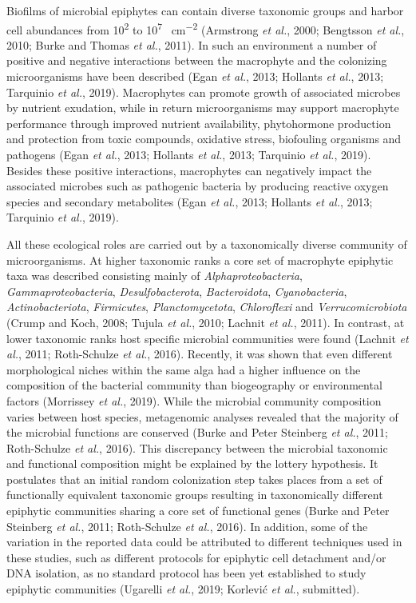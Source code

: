 \documentclass[12pt,]{article}
\begin{document}
Biofilms of microbial epiphytes can contain diverse taxonomic groups and
harbor cell abundances from 10\textsuperscript{2} to
10\textsuperscript{7} \si{\cells\per\cm\squared} (Armstrong \emph{et
al.}, 2000; Bengtsson \emph{et al.}, 2010; Burke and Thomas \emph{et
al.}, 2011). In such an environment a number of positive and negative
interactions between the macrophyte and the colonizing microorganisms
have been described (Egan \emph{et al.}, 2013; Hollants \emph{et al.},
2013; Tarquinio \emph{et al.}, 2019). Macrophytes can promote growth of
associated microbes by nutrient exudation, while in return
microorganisms may support macrophyte performance through improved
nutrient availability, phytohormone production and protection from toxic
compounds, oxidative stress, biofouling organisms and pathogens (Egan
\emph{et al.}, 2013; Hollants \emph{et al.}, 2013; Tarquinio \emph{et
al.}, 2019). Besides these positive interactions, macrophytes can
negatively impact the associated microbes such as pathogenic bacteria by
producing reactive oxygen species and secondary metabolites (Egan
\emph{et al.}, 2013; Hollants \emph{et al.}, 2013; Tarquinio \emph{et
al.}, 2019).

All these ecological roles are carried out by a taxonomically diverse
community of microorganisms. At higher taxonomic ranks a core set of
macrophyte epiphytic taxa was described consisting mainly of
\emph{Alphaproteobacteria}, \emph{Gammaproteobacteria},
\emph{Desulfobacterota}, \emph{Bacteroidota}, \emph{Cyanobacteria},
\emph{Actinobacteriota}, \emph{Firmicutes}, \emph{Planctomycetota},
\emph{Chloroflexi} and \emph{Verrucomicrobiota} (Crump and Koch, 2008;
Tujula \emph{et al.}, 2010; Lachnit \emph{et al.}, 2011). In contrast,
at lower taxonomic ranks host specific microbial communities were found
(Lachnit \emph{et al.}, 2011; Roth-Schulze \emph{et al.}, 2016).
Recently, it was shown that even different morphological niches within
the same alga had a higher influence on the composition of the bacterial
community than biogeography or environmental factors (Morrissey \emph{et
al.}, 2019). While the microbial community composition varies between
host species, metagenomic analyses revealed that the majority of the
microbial functions are conserved (Burke and Peter Steinberg \emph{et
al.}, 2011; Roth-Schulze \emph{et al.}, 2016). This discrepancy between
the microbial taxonomic and functional composition might be explained by
the lottery hypothesis. It postulates that an initial random
colonization step takes places from a set of functionally equivalent
taxonomic groups resulting in taxonomically different epiphytic
communities sharing a core set of functional genes (Burke and Peter
Steinberg \emph{et al.}, 2011; Roth-Schulze \emph{et al.}, 2016). In
addition, some of the variation in the reported data could be attributed
to different techniques used in these studies, such as different
protocols for epiphytic cell detachment and/or DNA isolation, as no
standard protocol has been yet established to study epiphytic
communities (Ugarelli \emph{et al.}, 2019; Korlević \emph{et al.},
submitted).
\end{document}
